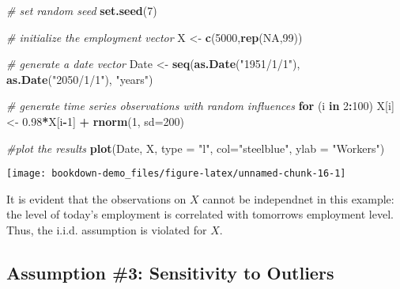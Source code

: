\documentclass[]{book}
\newenvironment{Shaded}{\begin{snugshade}}{\end{snugshade}}
\newcommand{\KeywordTok}[1]{\textcolor[rgb]{0.13,0.29,0.53}{\textbf{#1}}}
\newcommand{\DataTypeTok}[1]{\textcolor[rgb]{0.13,0.29,0.53}{#1}}
\newcommand{\DecValTok}[1]{\textcolor[rgb]{0.00,0.00,0.81}{#1}}
\newcommand{\FloatTok}[1]{\textcolor[rgb]{0.00,0.00,0.81}{#1}}
\newcommand{\StringTok}[1]{\textcolor[rgb]{0.31,0.60,0.02}{#1}}
\newcommand{\CommentTok}[1]{\textcolor[rgb]{0.56,0.35,0.01}{\textit{#1}}}
\newcommand{\OtherTok}[1]{\textcolor[rgb]{0.56,0.35,0.01}{#1}}
\newcommand{\ControlFlowTok}[1]{\textcolor[rgb]{0.13,0.29,0.53}{\textbf{#1}}}
\newcommand{\OperatorTok}[1]{\textcolor[rgb]{0.81,0.36,0.00}{\textbf{#1}}}
\newcommand{\NormalTok}[1]{#1}
\theoremstyle{definition}
\theoremstyle{definition}
\theoremstyle{definition}
\theoremstyle{remark}
\begin{document}
\begin{Shaded}
\begin{Highlighting}[]
\CommentTok{# set random seed}
\KeywordTok{set.seed}\NormalTok{(}\DecValTok{7}\NormalTok{)}

\CommentTok{# initialize the employment vector}
\NormalTok{X <-}\StringTok{ }\KeywordTok{c}\NormalTok{(}\DecValTok{5000}\NormalTok{,}\KeywordTok{rep}\NormalTok{(}\OtherTok{NA}\NormalTok{,}\DecValTok{99}\NormalTok{))}

\CommentTok{# generate a date vector}
\NormalTok{Date <-}\StringTok{ }\KeywordTok{seq}\NormalTok{(}\KeywordTok{as.Date}\NormalTok{(}\StringTok{"1951/1/1"}\NormalTok{), }\KeywordTok{as.Date}\NormalTok{(}\StringTok{"2050/1/1"}\NormalTok{), }\StringTok{"years"}\NormalTok{)}

\CommentTok{# generate time series observations with random influences}
\ControlFlowTok{for}\NormalTok{ (i }\ControlFlowTok{in} \DecValTok{2}\OperatorTok{:}\DecValTok{100}\NormalTok{) X[i] <-}\StringTok{ }\FloatTok{0.98}\OperatorTok{*}\NormalTok{X[i}\OperatorTok{-}\DecValTok{1}\NormalTok{] }\OperatorTok{+}\StringTok{ }\KeywordTok{rnorm}\NormalTok{(}\DecValTok{1}\NormalTok{, }\DataTypeTok{sd=}\DecValTok{200}\NormalTok{)}

\CommentTok{#plot the results}
\KeywordTok{plot}\NormalTok{(Date, X, }\DataTypeTok{type =} \StringTok{"l"}\NormalTok{, }\DataTypeTok{col=}\StringTok{"steelblue"}\NormalTok{, }\DataTypeTok{ylab =} \StringTok{"Workers"}\NormalTok{)}
\end{Highlighting}
\end{Shaded}

\begin{center}\texttt{[image: bookdown-demo\_files/figure-latex/unnamed-chunk-16-1]} \end{center}

It is evident that the observations on \(X\) cannot be independnet in
this example: the level of today's employment is correlated with
tomorrows employment level. Thus, the i.i.d. assumption is violated for
\(X\).

\subsection{Assumption \#3: Sensitivity to
Outliers}\label{assumption-3-sensitivity-to-outliers}
\end{document}
